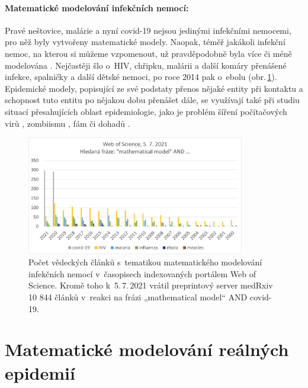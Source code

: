 
\paragraph{Matematické modelování infekčních nemocí:} Pravé neštovice, malárie a nyní covid-19 nejsou jedinými infekčními nemocemi, pro něž byly vytvořeny matematické modely. Naopak, téměř jakákoli infekční nemoc, na kterou si můžeme vzpomenout, už pravděpodobně byla více či méně modelována \cite{AndersonMay1991,KeelingRohani2008,VynnyckyWhite2010,Ronn_etal2017,Finger_etal2019}. Nejčastěji šlo o~HIV, chřipku, malárii a další komáry přenášené infekce, spalničky a další dětské nemoci, po roce 2014 pak o~ebolu (obr.\,\ref{wos}). Epidemické modely, popisující ze své podstaty přenos nějaké entity při kontaktu a schopnost tuto entitu po nějakou dobu přenášet dále, se využívají také při studiu situací přesahujících oblast epidemiologie, jako je problém šíření počítačových virů \cite{YangYang2014}, zombiismu \cite{Alemi_etal2015}, fám či dohadů \cite{DaleyKendall1964}.

\begin{figure}[ht]
\begin{center}
	\includegraphics[width=0.85\textwidth]{pic/wos_papers.png}
\end{center}
\caption{Počet vědeckých článků s~tematikou matematického modelování infekčních nemocí v~časopisech indexovaných portálem Web of Science. Kromě toho k~5.\,7.\,2021 vrátil preprintový server medRxiv 10 844 článků v~reakci na frázi „mathematical model“ AND covid-19.}
\label{wos}
\end{figure}

\section*{Matematické modelování reálných epidemií}

